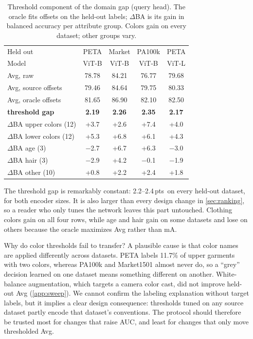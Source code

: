 \documentclass[10pt,twocolumn,letterpaper]{article}
\newcommand{\pts}{\,pts}
\begin{document}
\begin{table}[t]
\centering\small
\setlength{\tabcolsep}{2.8pt}
\begin{tabular}{@{}lcccc@{}}
\toprule
Held out & PETA & Market & PA100k & PETA \\
Model & ViT-B & ViT-B & ViT-B & ViT-L \\
\midrule
Avg, raw & 78.78 & 84.21 & 76.77 & 79.68 \\
Avg, source offsets & 79.46 & 84.64 & 79.75 & 80.33 \\
Avg, oracle offsets & 81.65 & 86.90 & 82.10 & 82.50 \\
\textbf{threshold gap} & \textbf{2.19} & \textbf{2.26} & \textbf{2.35} & \textbf{2.17} \\
\midrule
$\Delta$BA upper colors (12) & +3.7 & +2.6 & +7.4 & +4.0 \\
$\Delta$BA lower colors (12) & +5.3 & +6.8 & +6.1 & +4.3 \\
$\Delta$BA age (3) & $-$2.7 & +6.7 & +6.3 & $-$3.0 \\
$\Delta$BA hair (3) & $-$2.9 & +4.2 & $-$0.1 & $-$1.9 \\
$\Delta$BA other (10) & +0.8 & +2.2 & +2.4 & +1.8 \\
\bottomrule
\end{tabular}
\caption{Threshold component of the domain gap (query head). The oracle fits offsets on the held-out labels; $\Delta$BA is its gain in balanced accuracy per attribute group. Colors gain on every dataset; other groups vary.}
\label{tab:gap}
\end{table}

The threshold gap is remarkably constant: 2.2--2.4\pts\ on every held-out dataset, for both encoder sizes. It is also larger than every design change in \cref{sec:ranking}, so a reader who only tunes the network leaves this part untouched. Clothing colors gain on all four rows, while age and hair gain on some datasets and lose on others because the oracle maximizes Avg rather than mA.

Why do color thresholds fail to transfer? A plausible cause is that color names are applied differently across datasets. PETA labels 11.7\% of upper garments with two colors, whereas PA100k and Market1501 almost never do, so a ``grey'' decision learned on one dataset means something different on another. White-balance augmentation, which targets a camera color cast, did not improve held-out Avg (\cref{app:sweep}). We cannot confirm the labeling explanation without target labels, but it implies a clear design consequence: thresholds tuned on any source dataset partly encode that dataset's conventions. The protocol should therefore be trusted most for changes that raise AUC, and least for changes that only move thresholded Avg.
\end{document}
